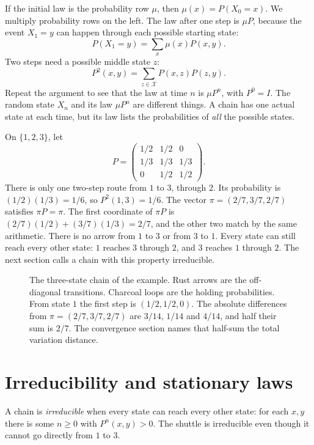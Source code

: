 If the initial law is the probability row $\mu$, then $\mu(x)=P(X_0=x)$. We multiply probability rows on the left. The law after one step is $\mu P$, because the event $X_1=y$ can happen through each possible starting state:
\[
 P(X_1=y)=\sum_x\mu(x)P(x,y).
\]
Two steps need a possible middle state $z$:
\[
 P^2(x,y)=\sum_{z\in\mathcal X}P(x,z)P(z,y).
\]
Repeat the argument to see that the law at time $n$ is $\mu P^n$, with $P^0=I$. The random state $X_n$ and its law $\mu P^n$ are different things. A chain has one actual state at each time, but its law lists the probabilities of \emph{all} the possible states.

\begin{examplex}
On $\{1,2,3\}$, let
\[
 P=\begin{pmatrix}1/2&1/2&0\\1/3&1/3&1/3\\0&1/2&1/2\end{pmatrix}.
\]
There is only one two-step route from $1$ to $3$, through $2$. Its probability is $(1/2)(1/3)=1/6$, so $P^2(1,3)=1/6$. The vector $\pi=(2/7,3/7,2/7)$ satisfies $\pi P=\pi$. The first coordinate of $\pi P$ is $(2/7)(1/2)+(3/7)(1/3)=2/7$, and the other two match by the same arithmetic. There is no arrow from $1$ to $3$ or from $3$ to $1$. Every state can still reach every other state: $1$ reaches $3$ through $2$, and $3$ reaches $1$ through $2$. The next section calls a chain with this property irreducible.
\end{examplex}

\begin{figure}[ht]
\centering
{}
\caption{The three-state chain of the example. Rust arrows are the off-diagonal transitions. Charcoal loops are the holding probabilities. From state $1$ the first step is $(1/2,1/2,0)$. The absolute differences from $\pi=(2/7,3/7,2/7)$ are $3/14$, $1/14$ and $4/14$, and half their sum is $2/7$. The convergence section names that half-sum the total variation distance.}
\label{fig:chain}
\end{figure}

\section{Irreducibility and stationary laws}

A chain is \emph{irreducible} when every state can reach every other state: for each $x,y$ there is some $n\ge0$ with $P^n(x,y)>0$. The shuttle is irreducible even though it cannot go directly from $1$ to $3$.

